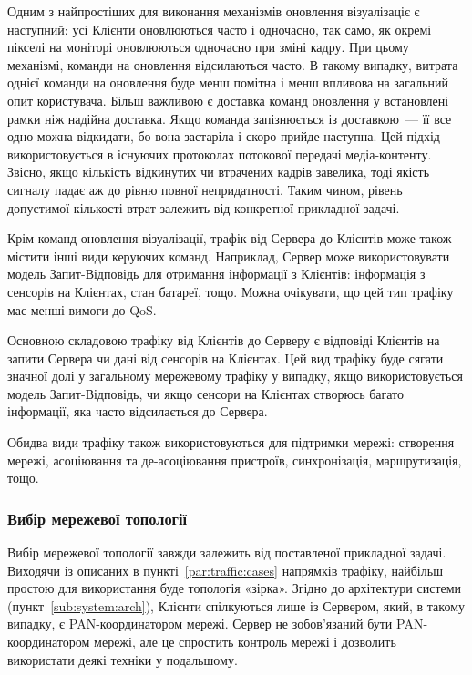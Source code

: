\documentclass[a4paper,ukrainian,utf8,nocolumnsxix,nocolumnxxxii,nocolumnxxxi,floatsection,equationsection]{eskdtext}
\renewcommand\paragraph{\subsubsection}
\begin{document}
Одним з найпростіших для виконання механізмів оновлення візуалізаціє є наступний: усі Клієнти оновлюються часто і одночасно, так само, як окремі пікселі на моніторі оновлюються одночасно при зміні кадру. При цьому механізмі, команди на оновлення відсилаються часто. В такому випадку, витрата однієї команди на оновлення буде менш помітна і менш впливова на загальний опит користувача. Більш важливою є доставка  команд оновлення у встановлені рамки ніж надійна доставка. Якщо команда запізнюється із доставкою~--- її все одно можна відкидати, бо вона застаріла і скоро прийде наступна. Цей підхід використовується в існуючих протоколах потокової передачі медіа-контенту. Звісно, якщо кількість відкинутих чи втрачених кадрів завелика, тоді якість сигналу падає аж до рівню повної непридатності. Таким чином, рівень допустимої кількості втрат залежить від конкретної прикладної задачі.

Крім команд оновлення візуалізації, трафік від Сервера до Клієнтів може також містити інші види керуючих команд. Наприклад, Сервер може використовувати модель Запит-Відповідь для отримання інформації з Клієнтів: інформація з сенсорів на Клієнтах, стан батареї, тощо. Можна очікувати, що цей тип трафіку має менші вимоги до QoS.

Основною складовою трафіку від Клієнтів до Серверу є відповіді Клієнтів на запити Сервера чи дані від сенсорів на Клієнтах. Цей вид трафіку буде сягати значної долі у загальному мережевому трафіку у випадку, якщо використовується модель Запит-Відповідь, чи якщо сенсори на Клієнтах створюсь багато інформації, яка часто відсилається до Сервера.

Обидва види трафіку також використовуються для підтримки мережі: створення мережі, асоціювання та де-асоціювання пристроїв, синхронізація, маршрутизація, тощо.

\paragraph{Вибір мережевої топології}

Вибір мережевої топології завжди залежить від поставленої прикладної задачі. Виходячи із описаних в пункті~\ref{par:traffic:cases} напрямків трафіку, найбільш простою для використання буде топологія «зірка». Згідно до архітектури системи (пункт~\ref{sub:system:arch}), Клієнти спілкуються лише із Сервером, який, в такому випадку, є PAN-координатором мережі. Сервер не зобов'язаний бути PAN-координатором мережі, але це спростить контроль мережі і дозволить використати деякі техніки у подальшому.
\end{document}
